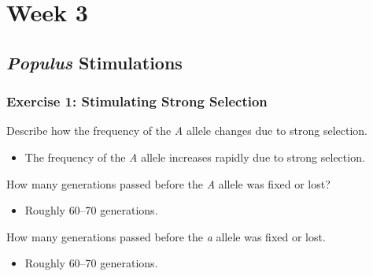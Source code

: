 \documentclass[12pt,a4paper]{article}
\begin{document}


\clearpage
\section*{Week 3}
{}

\subsection{\textit{Populus} Stimulations}
\begin{enumerate}
    \subsubsection*{Exercise 1: Stimulating Strong Selection}
    {\color{darklc}\item  Describe how the frequency of the \textit{A} allele changes due to strong selection.}
        \begin{itemize}
            \item The frequency of the \textit{A} allele {\color{pos}increases rapidly} due to strong selection.
        \end{itemize}
    {\color{darklc}\item How many generations passed before the \textit{A} allele was fixed or lost?}
        \begin{itemize}
            \item Roughly {\color{o-Sun}60--70} generations.
        \end{itemize}
    {\color{darklc}\item How many generations passed before the \textit{a} allele was fixed or lost.}
        \begin{itemize}
            \item Roughly {\color{o-Sun}60--70} generations.
        \end{itemize}

\end{enumerate}
\end{document}
